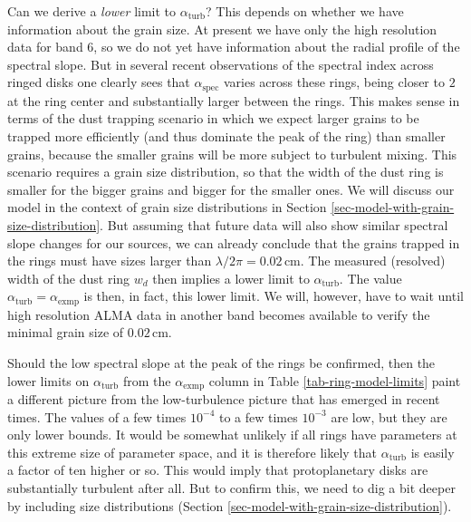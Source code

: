 \documentclass{aa}
\begin{document}
Can we derive a {\em lower} limit to $\alpha_{\mathrm{turb}}$? This depends on
whether we have information about the grain size. At present we have only the
high resolution data for band 6, so we do not yet have information about the
radial profile of the spectral slope. But in several recent observations of the
spectral index across ringed disks
\citep{2015ApJ...808L...3A,2018ApJ...852..122H} one clearly sees that
$\alpha_{\mathrm{spec}}$ varies across these rings, being closer to $2$ at the
ring center and substantially larger between the rings. This makes sense in
terms of the dust trapping scenario in which we expect larger grains to be
trapped more efficiently (and thus dominate the peak of the ring) than smaller
grains, because the smaller grains will be more subject to turbulent
mixing. This scenario requires a grain size distribution, so that the width of
the dust ring is smaller for the bigger grains and bigger for the smaller ones.
We will discuss our model in the context of grain size distributions in Section
\ref{sec-model-with-grain-size-distribution}. But assuming that future data will
also show similar spectral slope changes for our sources, we can already
conclude that the grains trapped in the rings must have sizes larger than
$\lambda/2\pi=0.02\,\mathrm{cm}$. The measured (resolved) width of the dust ring
$w_d$ then implies a lower limit to $\alpha_{\mathrm{turb}}$. The value
$\alpha_{\mathrm{turb}}=\alpha_{\mathrm{exmp}}$ is then, in fact, this lower
limit. We will, however, have to wait until high resolution ALMA data in another
band becomes available to verify the minimal grain size of $0.02\,\mathrm{cm}$.

Should the low spectral slope at the peak of the rings be confirmed, then the
lower limits on $\alpha_{\mathrm{turb}}$ from the $\alpha_{\mathrm{exmp}}$
column in Table \ref{tab-ring-model-limits} paint a different picture from the
low-turbulence picture that has emerged in recent times. The values of a few
times $10^{-4}$ to a few times $10^{-3}$ are low, but they are only lower
bounds. It would be somewhat unlikely if all rings have parameters at this
extreme size of parameter space, and it is therefore likely that
$\alpha_{\mathrm{turb}}$ is easily a factor of ten higher or so. This would
imply that protoplanetary disks are substantially turbulent after all. But to
confirm this, we need to dig a bit deeper by including size distributions
(Section \ref{sec-model-with-grain-size-distribution}).
\end{document}
